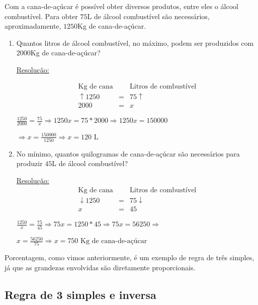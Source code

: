 \begin{exem}
\begin{enumerate}
 Com a cana-de-açúcar é possível obter diversos produtos, entre eles o álcool combustível. Para obter $75$L de álcool combustível são necessários, aproximadamente, $1250$Kg de cana-de-açúcar.
 \begin{enumerate}
  \item Quantos litros de álcool combustível, no máximo, podem ser produzidos com $2000$Kg de cana-de-açúcar?

 \underline{Resolução:}

 \begin{eqnarray*}
  \text{Kg de cana} & & \text{Litros de combustível} \\
  \uparrow 1250 & = & 75 \uparrow \\
  2000 & = & x
 \end{eqnarray*}

 $\frac{1250}{2000}= \frac{75}{x} \Rightarrow 1250 x = 75*2000 \Rightarrow 1250 x = 150000$

 $\Rightarrow x = \frac{150000}{1250} \Rightarrow x = 120 \text{ L}$
 \fim


  \item No mínimo, quantos quilogramas de cana-de-açúcar são necessários para produzir $45$L de álcool combustível?

  \underline{Resolução:}
  \begin{eqnarray*}
  \text{Kg de cana} & & \text{Litros de combustível} \\
  \downarrow 1250 & = & 75 \downarrow \\
  x & = & 45
 \end{eqnarray*}

 $\frac{1250}{x}=\frac{75}{45} \Rightarrow 75 x = 1250*45 \Rightarrow 75 x = 56250 \Rightarrow $

 $x = \frac{56250}{75} \Rightarrow x = 750 \text{ Kg de cana-de-açúcar}$
 \fim

 \end{enumerate}
 \end{enumerate}
\end{exem}

\begin{obs}
 Porcentagem, como vimos anteriormente, é um exemplo de regra de três simples, já que as grandezas envolvidas são diretamente proporcionais.
\end{obs}


\subsection{Regra de 3 simples e inversa}

